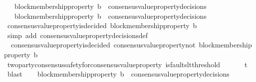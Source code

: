 \begin{isabellebody}
\ \ \ {\isachardoublequoteopen}block{\isacharunderscore}membership{\isacharunderscore}property\ b{}\ {\isasymin}\ consensus{\isacharunderscore}value{\isacharunderscore}property{\isacharunderscore}decisions\ {\isasymsigma}{}{\isachardoublequoteclose}\ \isanewline
\ \ \ {\isachardoublequoteopen}block{\isacharunderscore}membership{\isacharunderscore}property\ b{}\ {\isasymin}\ consensus{\isacharunderscore}value{\isacharunderscore}property{\isacharunderscore}decisions\ {\isasymsigma}{}{\isachardoublequoteclose}\ \isanewline
\ \ \isamarkupfalse%
\ {\isachardoublequoteopen}consensus{\isacharunderscore}value{\isacharunderscore}property{\isacharunderscore}is{\isacharunderscore}decided\ {\isacharparenleft}block{\isacharunderscore}membership{\isacharunderscore}property\ b{}{\isacharcomma}\ {\isasymsigma}{}{\isacharparenright}{\isachardoublequoteclose}\isanewline
\ \ \ \ \isamarkupfalse%
\ {\isacharparenleft}simp\ add{\isacharcolon}\ consensus{\isacharunderscore}value{\isacharunderscore}property{\isacharunderscore}decisions{\isacharunderscore}def{\isacharparenright}\isanewline
\ \ \isamarkupfalse%
\ {\isachardoublequoteopen}{\isasymnot}\ consensus{\isacharunderscore}value{\isacharunderscore}property{\isacharunderscore}is{\isacharunderscore}decided\ {\isacharparenleft}consensus{\isacharunderscore}value{\isacharunderscore}property{\isacharunderscore}not\ {\isacharparenleft}block{\isacharunderscore}membership{\isacharunderscore}property\ b{}{\isacharparenright}{\isacharcomma}\ {\isasymsigma}{}{\isacharparenright}{\isachardoublequoteclose}\ \ \ \ \ \ \isanewline
\ \ \ \ \isamarkupfalse%
\ two{\isacharunderscore}party{\isacharunderscore}consensus{\isacharunderscore}safety{\isacharunderscore}for{\isacharunderscore}consensus{\isacharunderscore}value{\isacharunderscore}property\ {\isacartoucheopen}is{\isacharunderscore}faults{\isacharunderscore}lt{\isacharunderscore}threshold\ {\isacharparenleft}{\isasymsigma}{}\ {\isasymunion}\ {\isasymsigma}{}{\isacharparenright}{\isacartoucheclose}\ {\isacartoucheopen}{\isacharbraceleft}{\isasymsigma}{}{\isacharcomma}\ {\isasymsigma}{}{\isacharbraceright}\ {\isasymsubseteq}\ {\isasymSigma}t{\isacartoucheclose}\ \isamarkupfalse%
\ blast\isanewline
\ \ \isamarkupfalse%
\ {\isachardoublequoteopen}block{\isacharunderscore}membership{\isacharunderscore}property\ b{}\ {\isasymin}\ consensus{\isacharunderscore}value{\isacharunderscore}property{\isacharunderscore}decisions\ {\isasymsigma}{}{\isachardoublequoteclose}\isanewline

\end{isabellebody}
